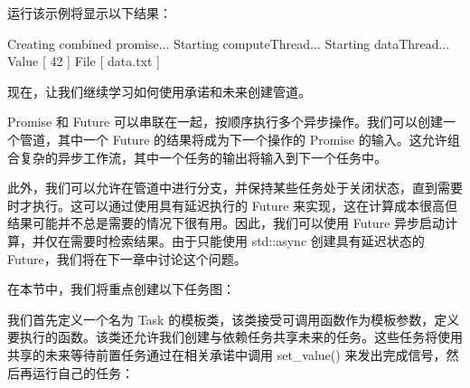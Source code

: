 运行该示例将显示以下结果：

\begin{shell}
Creating combined promise...
Starting computeThread...
Starting dataThread...
Value [ 42 ] File [ data.txt ]
\end{shell}

现在，让我们继续学习如何使用承诺和未来创建管道。


Promise 和 Future 可以串联在一起，按顺序执行多个异步操作。我们可以创建一个管道，其中一个 Future 的结果将成为下一个操作的 Promise 的输入。这允许组合复杂的异步工作流，其中一个任务的输出将输入到下一个任务中。

此外，我们可以允许在管道中进行分支，并保持某些任务处于关闭状态，直到需要时才执行。这可以通过使用具有延迟执行的 Future 来实现，这在计算成本很高但结果可能并不总是需要的情况下很有用。因此，我们可以使用 Future 异步启动计算，并仅在需要时检索结果。由于只能使用 std::async 创建具有延迟状态的 Future，我们将在下一章中讨论这个问题。

在本节中，我们将重点创建以下任务图：


我们首先定义一个名为 Task 的模板类，该类接受可调用函数作为模板参数，定义要执行的函数。该类还允许我们创建与依赖任务共享未来的任务。这些任务将使用共享的未来等待前置任务通过在相关承诺中调用 set\_value() 来发出完成信号，然后再运行自己的任务：

